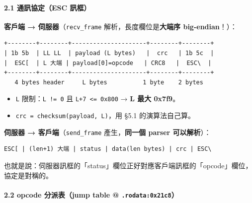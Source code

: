 \documentclass[10pt,a4paper]{article}
\providecommand{\tightlist}{%
  \setlength{\itemsep}{0pt}\setlength{\parskip}{0pt}}
\begin{document}
\paragraph{2.1 通訊協定（ESC
訊框）}\label{ux901aux8a0aux5354ux5b9aesc-ux8a0aux6846}

\textbf{客戶端 → 伺服器}（\texttt{recv\_\allowbreak{}frame}
解析，長度欄位是\textbf{大端序 big-endian}！）：

\begin{Verbatim}[breaklines=true,breakanywhere=true,breakautoindent=false,fontsize=\fontsize{7.0}{9.5}\selectfont]
+--------+--------+---------------------+--------+--------+
| 1b 5b  | LL LL  | payload (L bytes)   |  crc   | 1b 5c  |
|  ESC[  | L 大端 | payload[0]=opcode   | CRC8   |  ESC\  |
+--------+--------+---------------------+--------+--------+
   4 bytes header     L bytes          1 byte    2 bytes
\end{Verbatim}

\begin{itemize}
\tightlist
\item
  \texttt{L} 限制：\texttt{L\ \allowbreak{}!=\ \allowbreak{}0} 且
  \texttt{L+7\ \allowbreak{}\textless{}\allowbreak{}=\ \allowbreak{}0x800} → \textbf{L 最大 0x7f9}。
\item
  \texttt{crc\ \allowbreak{}=\ \allowbreak{}checksum(payload,\allowbreak{}\ \allowbreak{}L)}，用 §5.1 的演算法自己算。
\end{itemize}

\textbf{伺服器 → 客戶端}（\texttt{send\_\allowbreak{}frame} 產生，\textbf{同一個
parser 可以解析}）：

\begin{Verbatim}[breaklines=true,breakanywhere=true,breakautoindent=false,fontsize=\fontsize{7.0}{9.5}\selectfont]
ESC[ | (len+1) 大端 | status | data(len bytes) | crc | ESC\
\end{Verbatim}

也就是說：伺服器訊框的「status」欄位正好對應客戶端訊框的「opcode」欄位，協定是對稱的。

\paragraph{\texorpdfstring{2.2 opcode 分派表（jump table @
\texttt{.\allowbreak{}rodata:\allowbreak{}0x21c8}）}{2.2 opcode 分派表（jump table @ .rodata:0x21c8）}}\label{opcode-ux5206ux6d3eux8868jump-table-.rodata0x21c8}
\end{document}
